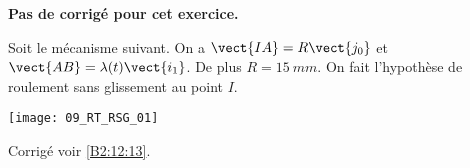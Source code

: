 \normalfalse \difficiletrue \tdifficilefalse
\correctionfalse


\setcounter{numques}{0}
\ifcorrection
\else
\textbf{Pas de corrigé pour cet exercice.}
\fi

\ifprof
\else
Soit le mécanisme suivant. On a $\vect{IA}=R\vect{j_0}$ et $\vect{AB}=\lambda(t)\vect{i_1}$. De plus $R=\SI{15}{mm}$.
On fait l'hypothèse de roulement sans glissement au point $I$.
\begin{center}
\texttt{[image: 09\_RT\_RSG\_01]}
\end{center}
\fi


\ifprof
\else
\fi

\ifprof
\else
\fi

\ifprof
\else
\fi



\ifprof
\else
\begin{flushright}
\footnotesize{Corrigé  voir \ref{B2:12:13}.}
\end{flushright}%
\fi